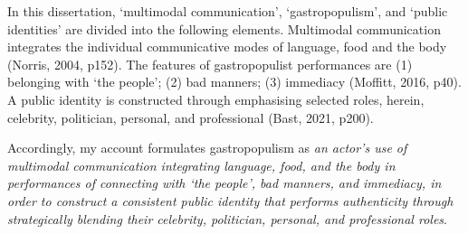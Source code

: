 \documentclass[a4paper, nobind]{templates/ociamthesis}
\begin{document}
In this dissertation, `multimodal communication', `gastropopulism', and `public identities' are divided into the following elements. Multimodal communication integrates the individual communicative modes of language, food and the body (Norris, 2004, p152). The features of gastropopulist performances are (1) belonging with `the people'; (2) bad manners; (3) immediacy (Moffitt, 2016, p40). A public identity is constructed through emphasising selected roles, herein, celebrity, politician, personal, and professional (Bast, 2021, p200).

Accordingly, my account formulates gastropopulism as \emph{an actor's use of multimodal communication integrating language, food, and the body in performances of connecting with `the people', bad manners, and immediacy, in order to construct a consistent public identity that performs authenticity through strategically blending their celebrity, politician, personal, and professional roles}.
\end{document}
